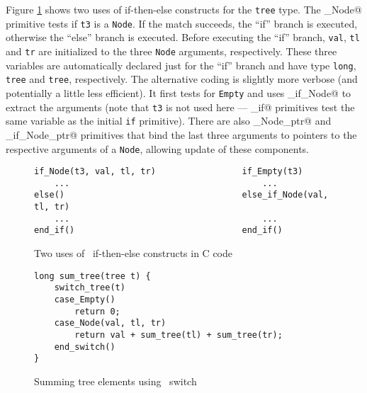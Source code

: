 Figure \ref{fig:patternmatch} shows two uses of if-then-else constructs
for the \texttt{tree} type.  The \verb@if_Node@ primitive tests if
\texttt{t3} is a \texttt{Node}. If the match succeeds, the ``if''
branch is executed, otherwise the ``else'' branch is executed.  Before
executing the ``if'' branch, \texttt{val}, \texttt{tl} and \texttt{tr}
are initialized to the three \texttt{Node} arguments, respectively.
These three variables are automatically declared just for the ``if''
branch and have type \texttt{long}, \texttt{tree} and \texttt{tree},
respectively.  The alternative coding is slightly more verbose (and
potentially a little less efficient).  It first tests for \texttt{Empty}
and uses \verb@else_if_Node@ to extract the arguments (note that
\texttt{t3} is not used here --- \verb@else_if@ primitives test the
same variable as the initial \texttt{if} primitive).  There are also
\verb@if_Node_ptr@ and \verb@else_if_Node_ptr@ primitives that bind
the last three arguments to pointers to the respective arguments of a
\texttt{Node}, allowing update of these components.

\begin{figure}[!ht]
\begin{center}
\begin{verbatim}
if_Node(t3, val, tl, tr)                 if_Empty(t3)
    ...                                      ...
else()                                   else_if_Node(val, tl, tr)
    ...                                      ...
end_if()                                 end_if()
\end{verbatim}
\end{center}
\caption{Two uses of \adtpp\ if-then-else constructs in C code}
\label{fig:patternmatch}
\end{figure}

\begin{figure}[!ht]
\begin{verbatim}
long sum_tree(tree t) {
    switch_tree(t)
    case_Empty()
        return 0;
    case_Node(val, tl, tr)
        return val + sum_tree(tl) + sum_tree(tr);
    end_switch()
}
\end{verbatim}
\caption{Summing tree elements using \adtpp\ switch}
\label{fig:switch}
\end{figure}

